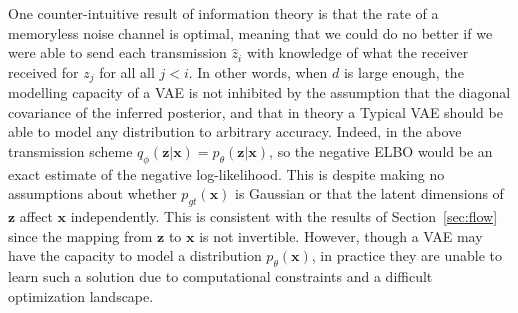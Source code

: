 \documentclass{article}
\begin{document}
One counter-intuitive result of information theory is that the rate of a memoryless noise channel is optimal, meaning that we could do no better if we were able to send each transmission $\hat{z}_i$ with knowledge of what the receiver received for $z_j$ for all all $j<i$. In other words, when $d$ is large enough, the modelling capacity of a VAE is not inhibited by the assumption that the diagonal covariance of the inferred posterior, and that in theory a Typical VAE should be able to model any distribution to arbitrary accuracy. 
Indeed, in the above transmission scheme $q_\phi(\mathbf{z}|\mathbf{x}) =p_\theta(\mathbf{z}|\mathbf{x})$, so the negative ELBO would be an exact estimate of the negative log-likelihood.
This is despite making no assumptions about whether $p_{gt}(\mathbf{x})$ is Gaussian or that the latent dimensions of $\mathbf{z}$ affect $\mathbf{x}$ independently.
This is consistent with the results of Section~\ref{sec:flow} since the mapping from $\mathbf{z}$ to $\mathbf{x}$ is not invertible.
However, though a VAE may have the capacity to model a distribution $p_\theta(\mathbf{x})$, in practice they are unable to learn such a solution due to computational constraints and a difficult optimization landscape.


\end{document}
